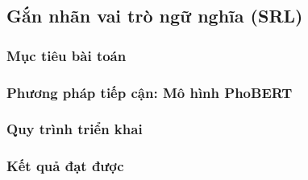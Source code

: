\subsection{Gắn nhãn vai trò ngữ nghĩa (SRL)}

\subsubsection{Mục tiêu bài toán}

\subsubsection{Phương pháp tiếp cận: Mô hình PhoBERT}

\subsubsection{Quy trình triển khai}

\subsubsection{Kết quả đạt được}